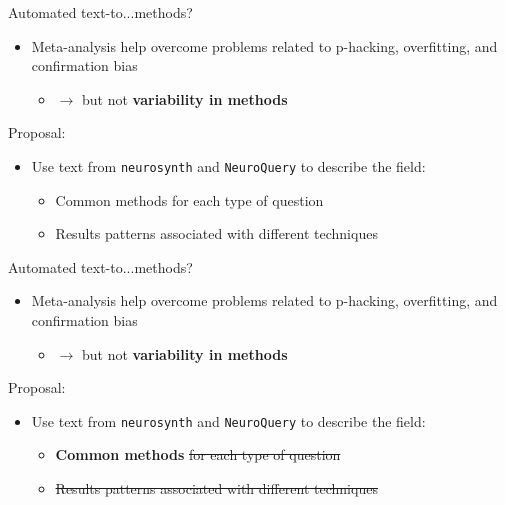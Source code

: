 \documentclass[aspectratio=169]{beamer}
\begin{document}
\begin{frame}{Automated text-to...methods?}
	\begin{itemize}
		\item Meta-analysis help overcome problems related to p-hacking, overfitting, and confirmation bias
		\begin{itemize}
			\item $\rightarrow$ but not \textbf{variability in methods}
		\end{itemize}

	\end{itemize}
	
	\vspace{3mm}
	
	\pause
	Proposal:
	
	\begin{itemize}
		\item Use text from \texttt{neurosynth} and \texttt{NeuroQuery} to describe the field:
		\begin{itemize}
			\item Common methods for each type of question
			\item Results patterns associated with different techniques
		\end{itemize}
	\end{itemize}
\end{frame}

\begin{frame}{Automated text-to...methods?}
	\begin{itemize}
		\item Meta-analysis help overcome problems related to p-hacking, overfitting, and confirmation bias
		\begin{itemize}
			\item $\rightarrow$ but not \textbf{variability in methods}
		\end{itemize}
		
	\end{itemize}
	
	\vspace{3mm}
	
	Proposal:
	
	\begin{itemize}
		\item Use text from \texttt{neurosynth} and \texttt{NeuroQuery} to describe the field:
		\begin{itemize}
			\item \textbf{Common methods} \sout{for each type of question}
			\item \sout{Results patterns associated with different techniques}
		\end{itemize}
	\end{itemize}
\end{frame}
\end{document}
